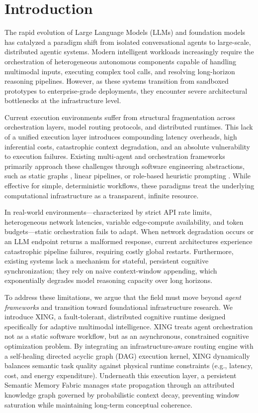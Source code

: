 \documentclass[conference]{IEEEtran}
\begin{document}
\section{Introduction}

The rapid evolution of Large Language Models (LLMs) and foundation models has catalyzed a paradigm shift from isolated conversational agents to large-scale, distributed agentic systems. Modern intelligent workloads increasingly require the orchestration of heterogeneous autonomous components capable of handling multimodal inputs, executing complex tool calls, and resolving long-horizon reasoning pipelines. However, as these systems transition from sandboxed prototypes to enterprise-grade deployments, they encounter severe architectural bottlenecks at the infrastructure level.

Current execution environments suffer from structural fragmentation across orchestration layers, model routing protocols, and distributed runtimes. This lack of a unified execution layer introduces compounding latency overheads, high inferential costs, catastrophic context degradation, and an absolute vulnerability to execution failures. Existing multi-agent and orchestration frameworks primarily approach these challenges through software engineering abstractions, such as static graphs \cite{langchain2023}, linear pipelines, or role-based heuristic prompting \cite{crewai2023}. While effective for simple, deterministic workflows, these paradigms treat the underlying computational infrastructure as a transparent, infinite resource.

In real-world environments---characterized by strict API rate limits, heterogeneous network latencies, variable edge-compute availability, and token budgets---static orchestration fails to adapt. When network degradation occurs or an LLM endpoint returns a malformed response, current architectures experience catastrophic pipeline failures, requiring costly global restarts. Furthermore, existing systems lack a mechanism for stateful, persistent cognitive synchronization; they rely on naive context-window appending, which exponentially degrades model reasoning capacity over long horizons.

To address these limitations, we argue that the field must move beyond \emph{agent frameworks} and transition toward foundational infrastructure research. We introduce XING, a fault-tolerant, distributed cognitive runtime designed specifically for adaptive multimodal intelligence. XING treats agent orchestration not as a static software workflow, but as an asynchronous, constrained cognitive optimization problem. By integrating an infrastructure-aware routing engine with a self-healing directed acyclic graph (DAG) execution kernel, XING dynamically balances semantic task quality against physical runtime constraints (e.g., latency, cost, and energy expenditure). Underneath this execution layer, a persistent Semantic Memory Fabric manages state propagation through an attributed knowledge graph governed by probabilistic context decay, preventing window saturation while maintaining long-term conceptual coherence.
\end{document}
